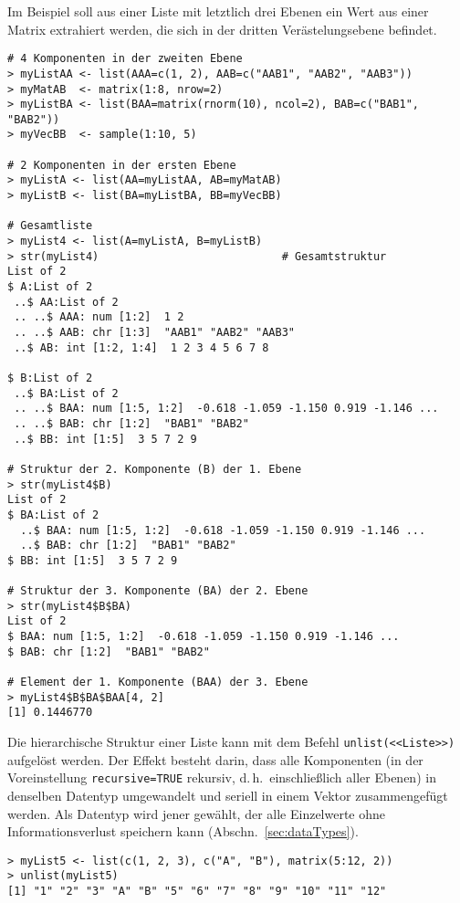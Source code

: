 Im Beispiel soll aus einer Liste mit letztlich drei Ebenen ein Wert aus einer Matrix extrahiert werden, die sich in der dritten Verästelungsebene befindet.
\begin{lstlisting}
# 4 Komponenten in der zweiten Ebene
> myListAA <- list(AAA=c(1, 2), AAB=c("AAB1", "AAB2", "AAB3"))
> myMatAB  <- matrix(1:8, nrow=2)
> myListBA <- list(BAA=matrix(rnorm(10), ncol=2), BAB=c("BAB1", "BAB2"))
> myVecBB  <- sample(1:10, 5)

# 2 Komponenten in der ersten Ebene
> myListA <- list(AA=myListAA, AB=myMatAB)
> myListB <- list(BA=myListBA, BB=myVecBB)

# Gesamtliste
> myList4 <- list(A=myListA, B=myListB)
> str(myList4)                            # Gesamtstruktur
List of 2
$ A:List of 2
 ..$ AA:List of 2
 .. ..$ AAA: num [1:2]  1 2
 .. ..$ AAB: chr [1:3]  "AAB1" "AAB2" "AAB3"
 ..$ AB: int [1:2, 1:4]  1 2 3 4 5 6 7 8

$ B:List of 2
 ..$ BA:List of 2
 .. ..$ BAA: num [1:5, 1:2]  -0.618 -1.059 -1.150 0.919 -1.146 ...
 .. ..$ BAB: chr [1:2]  "BAB1" "BAB2"
 ..$ BB: int [1:5]  3 5 7 2 9

# Struktur der 2. Komponente (B) der 1. Ebene
> str(myList4$B)
List of 2
$ BA:List of 2
  ..$ BAA: num [1:5, 1:2]  -0.618 -1.059 -1.150 0.919 -1.146 ...
  ..$ BAB: chr [1:2]  "BAB1" "BAB2"
$ BB: int [1:5]  3 5 7 2 9

# Struktur der 3. Komponente (BA) der 2. Ebene
> str(myList4$B$BA)
List of 2
$ BAA: num [1:5, 1:2]  -0.618 -1.059 -1.150 0.919 -1.146 ...
$ BAB: chr [1:2]  "BAB1" "BAB2"

# Element der 1. Komponente (BAA) der 3. Ebene
> myList4$B$BA$BAA[4, 2]
[1] 0.1446770
\end{lstlisting}

Die hierarchische Struktur einer Liste kann mit dem Befehl \lstinline!unlist(<<Liste>>)! aufgelöst werden. Der Effekt besteht darin, dass alle Komponenten (in der Voreinstellung \lstinline!recursive=TRUE! rekursiv, d.\,h.\ einschließlich aller Ebenen) in denselben Datentyp umgewandelt und seriell in einem Vektor zusammengefügt werden. Als Datentyp wird jener gewählt, der alle Einzelwerte ohne Informationsverlust speichern kann (Abschn.\ \ref{sec:dataTypes}).
\begin{lstlisting}
> myList5 <- list(c(1, 2, 3), c("A", "B"), matrix(5:12, 2))
> unlist(myList5)
[1] "1" "2" "3" "A" "B" "5" "6" "7" "8" "9" "10" "11" "12"
\end{lstlisting}


